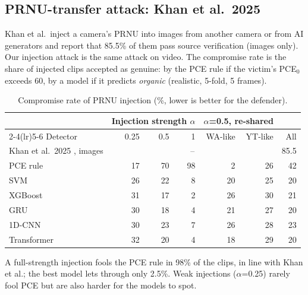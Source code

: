 \documentclass[11pt,a4paper]{article}
\begin{document}
\subsection{PRNU-transfer attack: Khan et al.~2025}
Khan et al.\ inject a camera's PRNU into images from another camera or from AI generators and report that 85.5\% of them pass source verification (images only). Our injection attack is the same attack on video. The compromise rate is the share of injected clips accepted as genuine: by the PCE rule if the victim's PCE$_0$ exceeds 60, by a model if it predicts \emph{organic} (realistic, 5-fold, 5 frames).
\begin{table}[H]\centering\small\caption{Compromise rate of PRNU injection (\%, lower is better for the defender).}\begin{tabular}{lrrrrrr}\toprule & \multicolumn{3}{c}{Injection strength $\alpha$} & \multicolumn{2}{c}{$\alpha$=0.5, re-shared} & \\\cmidrule(lr){2-4}\cmidrule(lr){5-6} Detector & 0.25 & 0.5 & 1 & WA-like & YT-like & All \\\midrule
Khan et al.~2025 \cite{khan2025}, images & \multicolumn{5}{c}{--} & 85.5 \\\midrule
PCE rule & 17 & 70 & 98 & 2 & 26 & 42 \\
SVM & 26 & 22 & 8 & 20 & 25 & 20 \\
XGBoost & 31 & 17 & 2 & 26 & 30 & 21 \\
GRU & 30 & 18 & 4 & 21 & 27 & 20 \\
1D-CNN & 30 & 23 & 7 & 26 & 28 & 23 \\
Transformer & 32 & 20 & 4 & 18 & 29 & 20 \\
\bottomrule\end{tabular}\end{table}
A full-strength injection fools the PCE rule in 98\% of the clips, in line with Khan et al.; the best model lets through only 2.5\%. Weak injections ($\alpha$=0.25) rarely fool PCE but are also harder for the models to spot.
\end{document}
